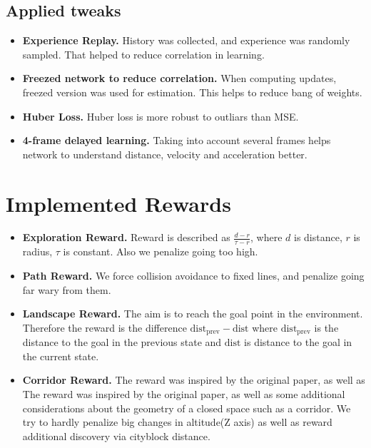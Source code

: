 \documentclass{article}
\begin{document}
\subsection{Applied tweaks}

\begin{itemize}
    \item {\bf Experience Replay.} History was collected, and experience was randomly sampled. That helped to reduce correlation in learning.
    \item {\bf Freezed network to reduce correlation.} When computing updates, freezed version was used for estimation. This helps
        to reduce bang of weights.
    \item {\bf Huber Loss.} Huber loss is more robust
        to outliars than MSE.
    \item {\bf 4-frame delayed learning.}
        Taking into account several frames helps network to understand
        distance, velocity and acceleration better.
\end{itemize}

\section{Implemented Rewards}

\begin{itemize}
    \item {\bf Exploration Reward.} Reward is described as $\frac{d - r}{\tau - r}$, where $d$ is distance, $r$ is radius, $\tau$ is constant.
        Also we penalize going too high.
    \item {\bf Path Reward.} We force collision avoidance to fixed lines, and penalize going far wary from them.
    \item {\bf Landscape Reward.} The aim is to reach the goal point in the environment. Therefore the reward is the difference $\text{dist}_{\text{prev}} - \text{dist}$ where $\text{dist}_{\text{prev}}$ is the distance to the goal in the previous state and $\text{dist}$ is distance to the goal in the current state. 
    \item {\bf Corridor Reward.} The reward was inspired by the original paper, as well as  The reward was inspired by the original paper\cite{cad2rl}, as well as some additional considerations about the geometry of a closed space such as a corridor. We try to hardly penalize big changes in altitude(Z axis) as well as reward additional discovery via cityblock distance.  
\end{itemize}
\end{document}
